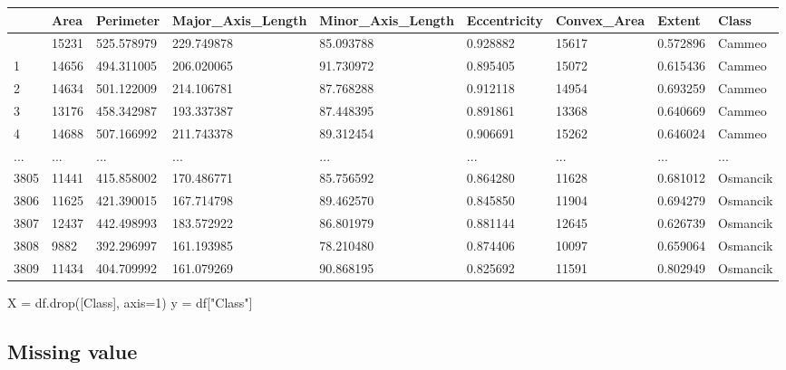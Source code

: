 \documentclass[
  letterpaper,
]{krantz}
\makeatletter
\newenvironment{Shaded}{\begin{snugshade}}{\end{snugshade}}
\newcommand{\DecValTok}[1]{\textcolor[rgb]{0.68,0.00,0.00}{#1}}
\newcommand{\NormalTok}[1]{\textcolor[rgb]{0.00,0.23,0.31}{#1}}
\newcommand{\OperatorTok}[1]{\textcolor[rgb]{0.37,0.37,0.37}{#1}}
\newcommand{\StringTok}[1]{\textcolor[rgb]{0.13,0.47,0.30}{#1}}
\newenvironment{kframe}{%
\medskip{}
\setlength{\fboxsep}{.8em}
 \def\at@end@of@kframe{}%
 \ifinner\ifhmode%
  \def\at@end@of@kframe{\end{minipage}}%
  \begin{minipage}{\columnwidth}%
 \fi\fi%
 \def\FrameCommand##1{\hskip\@totalleftmargin \hskip-\fboxsep
 \colorbox{shadecolor}{##1}\hskip-\fboxsep
     \hskip-\linewidth \hskip-\@totalleftmargin \hskip\columnwidth}%
 \MakeFramed {\advance\hsize-\width
   \@totalleftmargin\z@ \linewidth\hsize
   \@setminipage}}%
 {\par\unskip\endMakeFramed%
 \at@end@of@kframe}
\renewenvironment{Shaded}{\begin{kframe}}{\end{kframe}}
\makeatother
\begin{document}
\begin{longtable}[]{@{}lllllllll@{}}
\toprule\noalign{}
& Area & Perimeter & Major\_Axis\_Length & Minor\_Axis\_Length &
Eccentricity & Convex\_Area & Extent & Class \\
\midrule\noalign{}
\endhead
\bottomrule\noalign{}
\endlastfoot
0 & 15231 & 525.578979 & 229.749878 & 85.093788 & 0.928882 & 15617 &
0.572896 & Cammeo \\
1 & 14656 & 494.311005 & 206.020065 & 91.730972 & 0.895405 & 15072 &
0.615436 & Cammeo \\
2 & 14634 & 501.122009 & 214.106781 & 87.768288 & 0.912118 & 14954 &
0.693259 & Cammeo \\
3 & 13176 & 458.342987 & 193.337387 & 87.448395 & 0.891861 & 13368 &
0.640669 & Cammeo \\
4 & 14688 & 507.166992 & 211.743378 & 89.312454 & 0.906691 & 15262 &
0.646024 & Cammeo \\
... & ... & ... & ... & ... & ... & ... & ... & ... \\
3805 & 11441 & 415.858002 & 170.486771 & 85.756592 & 0.864280 & 11628 &
0.681012 & Osmancik \\
3806 & 11625 & 421.390015 & 167.714798 & 89.462570 & 0.845850 & 11904 &
0.694279 & Osmancik \\
3807 & 12437 & 442.498993 & 183.572922 & 86.801979 & 0.881144 & 12645 &
0.626739 & Osmancik \\
3808 & 9882 & 392.296997 & 161.193985 & 78.210480 & 0.874406 & 10097 &
0.659064 & Osmancik \\
3809 & 11434 & 404.709992 & 161.079269 & 90.868195 & 0.825692 & 11591 &
0.802949 & Osmancik \\
\end{longtable}

\begin{Shaded}
\begin{Highlighting}[]
\NormalTok{X }\OperatorTok{=}\NormalTok{ df.drop([}\StringTok{\textquotesingle{}Class\textquotesingle{}}\NormalTok{], axis}\OperatorTok{=}\DecValTok{1}\NormalTok{)}
\NormalTok{y }\OperatorTok{=}\NormalTok{ df[}\StringTok{"Class"}\NormalTok{]}
\end{Highlighting}
\end{Shaded}

\hypertarget{missing-value}{%
\subsection{Missing value}\label{missing-value}}
\end{document}

